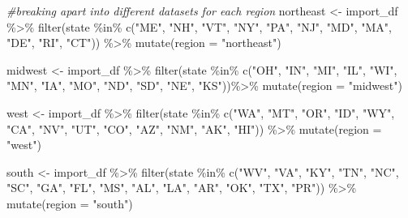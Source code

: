 \documentclass[12pt, twoside]{amherstthesis}
\newenvironment{Shaded}{\begin{snugshade}}{\end{snugshade}}
\newcommand{\AttributeTok}[1]{\textcolor[rgb]{0.77,0.63,0.00}{#1}}
\newcommand{\CommentTok}[1]{\textcolor[rgb]{0.56,0.35,0.01}{\textit{#1}}}
\newcommand{\FunctionTok}[1]{\textcolor[rgb]{0.00,0.00,0.00}{#1}}
\newcommand{\NormalTok}[1]{#1}
\newcommand{\OtherTok}[1]{\textcolor[rgb]{0.56,0.35,0.01}{#1}}
\newcommand{\SpecialCharTok}[1]{\textcolor[rgb]{0.00,0.00,0.00}{#1}}
\newcommand{\StringTok}[1]{\textcolor[rgb]{0.31,0.60,0.02}{#1}}
\begin{document}
\begin{Shaded}
\begin{Highlighting}[]
\CommentTok{\#breaking apart into different datasets for each region}
\NormalTok{northeast }\OtherTok{\textless{}{-}}\NormalTok{ import\_df }\SpecialCharTok{\%\textgreater{}\%}
  \FunctionTok{filter}\NormalTok{(state }\SpecialCharTok{\%in\%} \FunctionTok{c}\NormalTok{(}\StringTok{"ME"}\NormalTok{, }\StringTok{"NH"}\NormalTok{, }\StringTok{"VT"}\NormalTok{, }\StringTok{"NY"}\NormalTok{, }\StringTok{"PA"}\NormalTok{, }\StringTok{"NJ"}\NormalTok{, }\StringTok{"MD"}\NormalTok{, }
                      \StringTok{"MA"}\NormalTok{, }\StringTok{"DE"}\NormalTok{, }\StringTok{"RI"}\NormalTok{, }\StringTok{"CT"}\NormalTok{)) }\SpecialCharTok{\%\textgreater{}\%}
  \FunctionTok{mutate}\NormalTok{(}\AttributeTok{region =} \StringTok{"northeast"}\NormalTok{)}

\NormalTok{midwest }\OtherTok{\textless{}{-}}\NormalTok{ import\_df }\SpecialCharTok{\%\textgreater{}\%}
  \FunctionTok{filter}\NormalTok{(state }\SpecialCharTok{\%in\%} \FunctionTok{c}\NormalTok{(}\StringTok{"OH"}\NormalTok{, }\StringTok{"IN"}\NormalTok{, }\StringTok{"MI"}\NormalTok{, }\StringTok{"IL"}\NormalTok{, }\StringTok{"WI"}\NormalTok{, }\StringTok{"MN"}\NormalTok{, }\StringTok{"IA"}\NormalTok{, }
                      \StringTok{"MO"}\NormalTok{, }\StringTok{"ND"}\NormalTok{, }\StringTok{"SD"}\NormalTok{, }\StringTok{"NE"}\NormalTok{, }\StringTok{"KS"}\NormalTok{))}\SpecialCharTok{\%\textgreater{}\%}
  \FunctionTok{mutate}\NormalTok{(}\AttributeTok{region =} \StringTok{"midwest"}\NormalTok{)}

\NormalTok{west }\OtherTok{\textless{}{-}}\NormalTok{ import\_df }\SpecialCharTok{\%\textgreater{}\%}
  \FunctionTok{filter}\NormalTok{(state }\SpecialCharTok{\%in\%} \FunctionTok{c}\NormalTok{(}\StringTok{"WA"}\NormalTok{, }\StringTok{"MT"}\NormalTok{, }\StringTok{"OR"}\NormalTok{, }\StringTok{"ID"}\NormalTok{, }\StringTok{"WY"}\NormalTok{, }\StringTok{"CA"}\NormalTok{, }\StringTok{"NV"}\NormalTok{, }
                      \StringTok{"UT"}\NormalTok{, }\StringTok{"CO"}\NormalTok{, }\StringTok{"AZ"}\NormalTok{, }\StringTok{"NM"}\NormalTok{, }\StringTok{"AK"}\NormalTok{, }\StringTok{"HI"}\NormalTok{)) }\SpecialCharTok{\%\textgreater{}\%}
  \FunctionTok{mutate}\NormalTok{(}\AttributeTok{region =} \StringTok{"west"}\NormalTok{)}

\NormalTok{south }\OtherTok{\textless{}{-}}\NormalTok{ import\_df }\SpecialCharTok{\%\textgreater{}\%}
  \FunctionTok{filter}\NormalTok{(state }\SpecialCharTok{\%in\%} \FunctionTok{c}\NormalTok{(}\StringTok{"WV"}\NormalTok{, }\StringTok{"VA"}\NormalTok{, }\StringTok{"KY"}\NormalTok{, }\StringTok{"TN"}\NormalTok{, }\StringTok{"NC"}\NormalTok{, }\StringTok{"SC"}\NormalTok{, }\StringTok{"GA"}\NormalTok{, }
                      \StringTok{"FL"}\NormalTok{, }\StringTok{"MS"}\NormalTok{, }\StringTok{"AL"}\NormalTok{, }\StringTok{"LA"}\NormalTok{, }\StringTok{"AR"}\NormalTok{, }\StringTok{"OK"}\NormalTok{, }\StringTok{"TX"}\NormalTok{, }
                      \StringTok{"PR"}\NormalTok{)) }\SpecialCharTok{\%\textgreater{}\%}
  \FunctionTok{mutate}\NormalTok{(}\AttributeTok{region =} \StringTok{"south"}\NormalTok{)}


\end{Highlighting}
\end{Shaded}
\end{document}
